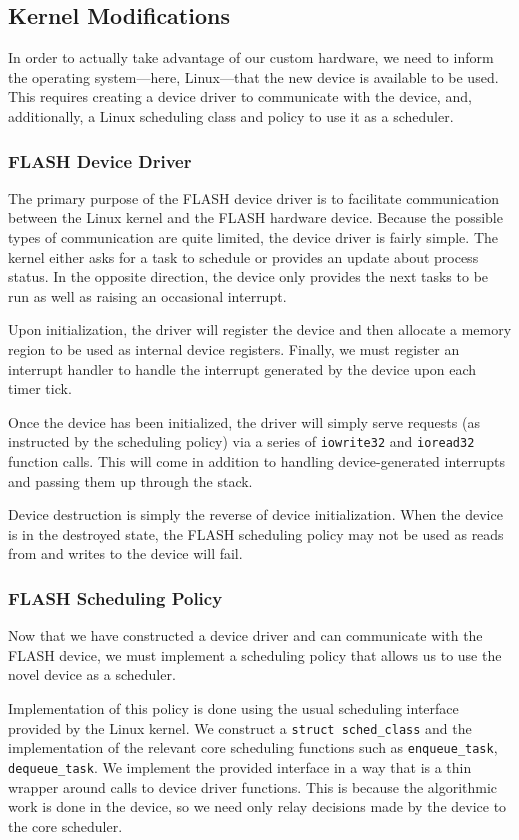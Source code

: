 \documentclass{sig-alternate-10pt}
\begin{document}
\subsection{Kernel Modifications}
In order to actually take advantage of our custom hardware, we need to
inform the operating system---here, Linux---that the new device is available
to be used.  This requires creating a device driver to communicate with the
device, and, additionally, a Linux scheduling class and policy to use it as
a scheduler.

\subsubsection{FLASH Device Driver}
The primary purpose of the FLASH device driver is to facilitate
communication between the Linux kernel and the FLASH hardware device.
Because the possible types of communication are quite limited, the device
driver is fairly simple.  The kernel either asks for a task to schedule or
provides an update about process status.  In the opposite direction, the
device only provides the next tasks to be run as well as raising an
occasional interrupt.

Upon initialization, the driver will register the device and then allocate
a memory region to be used as internal device registers.  Finally, we must
register an interrupt handler to handle the interrupt generated by the
device upon each timer tick.

Once the device has been initialized, the driver will simply serve requests
(as instructed by the scheduling policy) via a series of \texttt{iowrite32}
and \texttt{ioread32} function calls.  This will come in addition to
handling device-generated interrupts and passing them up through the stack.

Device destruction is simply the reverse of device initialization.  When the
device is in the destroyed state, the FLASH scheduling policy may not be
used as reads from and writes to the device will fail.

\subsubsection{FLASH Scheduling Policy}
Now that we have constructed a device driver and can communicate with the
FLASH device, we must implement a scheduling policy that allows us to use
the novel device as a scheduler.

Implementation of this policy is done using the usual scheduling interface
provided by the Linux kernel.  We construct a \texttt{struct sched\_class}
and the implementation of the relevant core scheduling functions such as
\texttt{enqueue\_task}, \texttt{dequeue\_task}.  We implement the provided
interface in a way that is a thin wrapper around calls to device driver
functions.  This is because the algorithmic work is done in the device, so
we need only relay decisions made by the device to the core scheduler.
\end{document}
